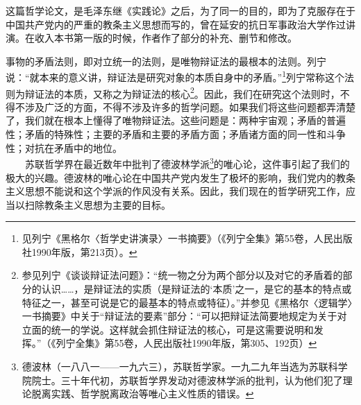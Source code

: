 \documentclass[cn,11pt,chinese]{elegantbook}
\begin{document}
\begin{introduction}\item  这篇哲学论文，是毛泽东继《实践论》之后，为了同一的目的，即为了克服存在于中国共产党内的严重的教条主义思想而写的，曾在延安的抗日军事政治大学作过讲演。在收入本书第一版的时候，作者作了部分的补充、删节和修改。\end{introduction}
事物的矛盾法则，即对立统一的法则，是唯物辩证法的最根本的法则。列宁说：“就本来的意义讲，辩证法是研究对象的本质自身中的矛盾。”\footnote[1]{ 见列宁《黑格尔〈哲学史讲演录〉一书摘要》（《列宁全集》第55卷，人民出版社1990年版，第213页）。}列宁常称这个法则为辩证法的本质，又称之为辩证法的核心\footnote[2]{ 参见列宁《谈谈辩证法问题》：“统一物之分为两个部分以及对它的矛盾着的部分的认识……，是辩证法的实质（是辩证法的‘本质’之一，是它的基本的特点或特征之一，甚至可说是它的最基本的特点或特征）。”并参见《黑格尔〈逻辑学〉一书摘要》中关于“辩证法的要素”部分：“可以把辩证法简要地规定为关于对立面的统一的学说。这样就会抓住辩证法的核心，可是这需要说明和发挥。”（《列宁全集》第55卷，人民出版社1990年版，第305、192页）}。因此，我们在研究这个法则时，不得不涉及广泛的方面，不得不涉及许多的哲学问题。如果我们将这些问题都弄清楚了，我们就在根本上懂得了唯物辩证法。这些问题是：两种宇宙观；矛盾的普遍性；矛盾的特殊性；主要的矛盾和主要的矛盾方面；矛盾诸方面的同一性和斗争性；对抗在矛盾中的地位。\\
　　苏联哲学界在最近数年中批判了德波林学派\footnote[3]{ 德波林（一八八一——一九六三），苏联哲学家。一九二九年当选为苏联科学院院士。三十年代初，苏联哲学界发动对德波林学派的批判，认为他们犯了理论脱离实践、哲学脱离政治等唯心主义性质的错误。}的唯心论，这件事引起了我们的极大的兴趣。德波林的唯心论在中国共产党内发生了极坏的影响，我们党内的教条主义思想不能说和这个学派的作风没有关系。因此，我们现在的哲学研究工作，应当以扫除教条主义思想为主要的目标。\\
\end{document}
